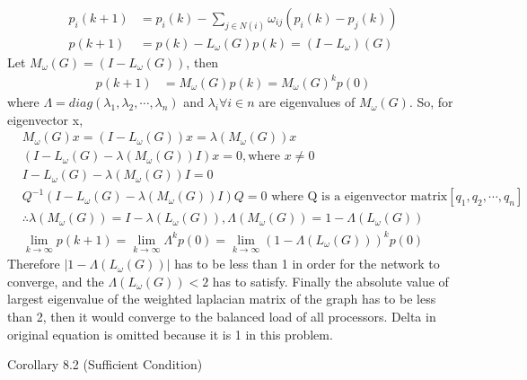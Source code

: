 \documentclass{article}
\begin{document}
\begin{problem}
    \begin{align*}
        p_i(k+1) &= p_i(k) - \sum_{j \in N(i)} \omega_{ij}(p_i(k) - p_j(k))\\
        p(k+1) &= p(k) - L_{\omega}(G) p(k) = (I - L_{\omega})(G)
    \end{align*}
    Let $M_{\omega}(G) = (I - L_{\omega}(G))$, then
    \begin{align*}
        p(k+1) &= M_{\omega}(G) p(k) = M_{\omega}(G) ^k p(0)
    \end{align*}
    where $\Lambda = diag(\lambda_1, \lambda_2, \cdots,  \lambda_n)$ and $\lambda_i \forall i \in n$ are eigenvalues of $M_{\omega}(G)$. So, for eigenvector x,
    \begin{align*}
        &M_{\omega}(G) x = (I - L_{\omega}(G)) x = \lambda(M_{\omega}(G)) x\\
        &(I - L_{\omega}(G)- \lambda(M_{\omega}(G)) I) x = 0,\text{where } x \neq 0\\
        &I - L_{\omega}(G)- \lambda(M_{\omega}(G)) I = 0\\
        &Q^{-1} (I - L_{\omega}(G)- \lambda(M_{\omega}(G)) I) Q = 0 \text{ where Q is a eigenvector matrix} [q_1, q_2, \cdots, q_n] \\
        &\therefore \lambda(M_{\omega}(G)) = I - \lambda(L_{\omega}(G)), \Lambda(M_{\omega}(G)) = 1- \Lambda(L_{\omega}(G))\\
        &\lim_{k\rightarrow\infty}p(k+1) =\lim_{k\rightarrow\infty} \Lambda ^k p(0) =  \lim_{k\rightarrow\infty}(1- \Lambda(L_{\omega}(G)))^k p(0) 
    \end{align*}
        Therefore $|1- \Lambda(L_{\omega}(G))|$ has to be less than 1 in order for the network to converge, and the $\Lambda(L_{\omega}(G)) < 2$ has to satisfy. Finally the absolute value of largest eigenvalue of the weighted laplacian matrix of the graph has to be less than 2, then it would converge to the balanced load of all processors. Delta in original equation is omitted because it is 1 in this problem.

        Corollary 8.2 (Sufficient Condition)


\end{problem}
\end{document}
